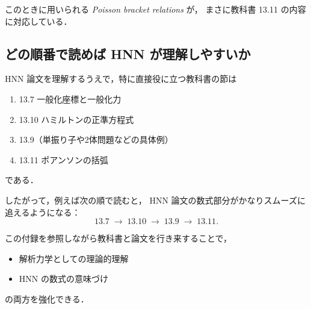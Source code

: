 \documentclass[a4paper,12pt]{jlreq}
\begin{document}
このときに用いられる \emph{Poisson bracket relations} が，
まさに教科書 13.11 の内容に対応している．

\subsection*{どの順番で読めば HNN が理解しやすいか}

HNN 論文を理解するうえで，特に直接役に立つ教科書の節は
\begin{enumerate}
  \item 13.7 一般化座標と一般化力
  \item 13.10 ハミルトンの正準方程式
  \item 13.9（単振り子や2体問題などの具体例）
  \item 13.11 ポアンソンの括弧
\end{enumerate}
である．

したがって，例えば次の順で読むと，
HNN 論文の数式部分がかなりスムーズに追えるようになる：
\[
  13.7 \;\to\; 13.10 \;\to\; 13.9 \;\to\; 13.11.
\]

この付録を参照しながら教科書と論文を行き来することで，
\begin{itemize}
  \item 解析力学としての理論的理解
  \item HNN の数式の意味づけ
\end{itemize}
の両方を強化できる．
\end{document}
